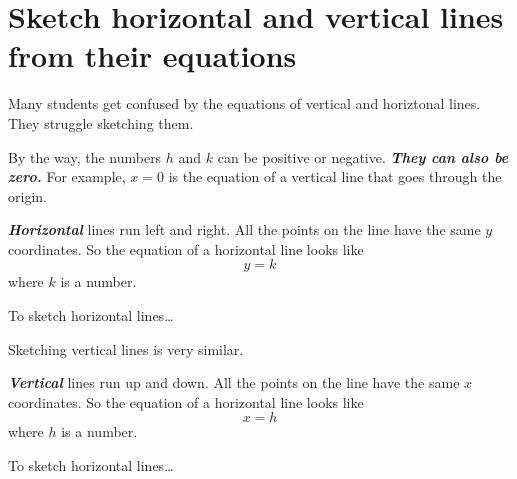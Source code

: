 \section*{Sketch horizontal and vertical lines from their equations}

Many students get confused by the equations of vertical and horiztonal lines.
They struggle sketching them.


By the way, the numbers $h$ and $k$ can be positive or negative.
{\bfseries\itshape They can also be zero.}
For example, $x=0$ is the equation of a vertical line that goes through the origin.

\begin{center}
    \begin{tcolorbox}[width=5in]
        {\bfseries\itshape Horizontal} lines run left and right.
        All the points on the line have the same $y$ coordinates.
        So the equation of a horizontal line looks like
        \[ y = k \]
        where $k$ is a number.
    \end{tcolorbox}
\end{center}

\begin{myConceptSteps}{To sketch horizontal lines\dots}
\end{myConceptSteps}







Sketching vertical lines is very similar.
\begin{center}
    \begin{tcolorbox}[width=5in]
        {\bfseries\itshape Vertical} lines run up and down.
        All the points on the line have the same $x$ coordinates.
        So the equation of a horizontal line looks like
        \[ x = h \]
        where $h$ is a number.
    \end{tcolorbox}
\end{center}

\begin{myConceptSteps}{To sketch horizontal lines\dots}
\end{myConceptSteps}






